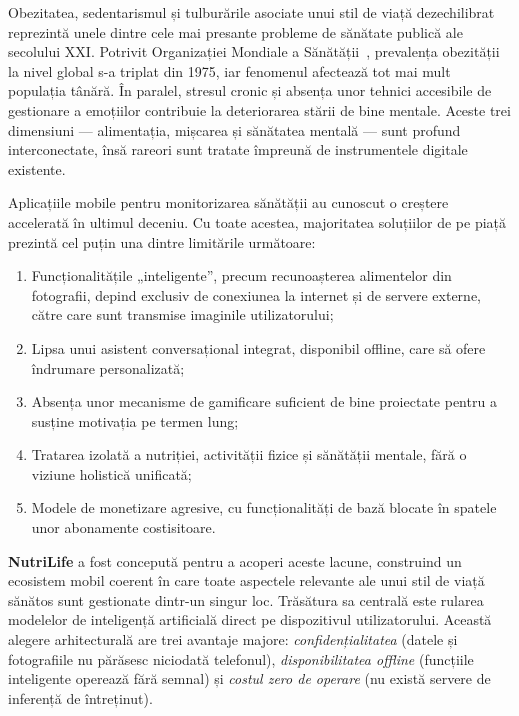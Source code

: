\documentclass[12pt, a4paper, twoside]{report}
\numberwithin{equation}{section}
\begin{document}
Obezitatea, sedentarismul și tulburările asociate unui stil de viață dezechilibrat
reprezintă unele dintre cele mai presante probleme de sănătate publică ale secolului XXI.
Potrivit Organizației Mondiale a Sănătății~\cite{who_obesity}, prevalența obezității la nivel global s-a
triplat din 1975, iar fenomenul afectează tot mai mult populația tânără. În paralel,
stresul cronic și absența unor tehnici accesibile de gestionare a emoțiilor contribuie la
deteriorarea stării de bine mentale. Aceste trei dimensiuni --- alimentația, mișcarea și
sănătatea mentală --- sunt profund interconectate, însă rareori sunt tratate împreună de
instrumentele digitale existente.

Aplicațiile mobile pentru monitorizarea sănătății au cunoscut o creștere accelerată în
ultimul deceniu. Cu toate acestea, majoritatea soluțiilor de pe piață prezintă cel puțin
una dintre limitările următoare:

\begin{enumerate}
  \item Funcționalitățile „inteligente'', precum recunoașterea alimentelor din fotografii,
    depind exclusiv de conexiunea la internet și de servere externe, către care sunt
    transmise imaginile utilizatorului;
  \item Lipsa unui asistent conversațional integrat, disponibil offline, care să ofere
    îndrumare personalizată;
  \item Absența unor mecanisme de gamificare suficient de bine proiectate pentru a susține
    motivația pe termen lung;
  \item Tratarea izolată a nutriției, activității fizice și sănătății mentale, fără o
    viziune holistică unificată;
  \item Modele de monetizare agresive, cu funcționalități de bază blocate în spatele unor
    abonamente costisitoare.
\end{enumerate}

\textbf{NutriLife} a fost concepută pentru a acoperi aceste lacune, construind un ecosistem
mobil coerent în care toate aspectele relevante ale unui stil de viață sănătos sunt
gestionate dintr-un singur loc. Trăsătura sa centrală este rularea modelelor de inteligență
artificială direct pe dispozitivul utilizatorului. Această alegere arhitecturală are trei
avantaje majore: \emph{confidențialitatea} (datele și fotografiile nu părăsesc niciodată
telefonul), \emph{disponibilitatea offline} (funcțiile inteligente operează fără semnal) și
\emph{costul zero de operare} (nu există servere de inferență de întreținut).
\end{document}
